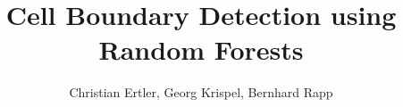 \documentclass[fontsize=12pt, titlepage, bibliography=totoc, listof=totoc]{scrartcl}
\begin{document}
\author{Christian Ertler, Georg Krispel, Bernhard Rapp}
\title{Cell Boundary Detection using Random Forests}
\subject{Medical Image Analysis, Design Practical}

\maketitle
\tableofcontents


%




\newpage

{}

\end{document}
